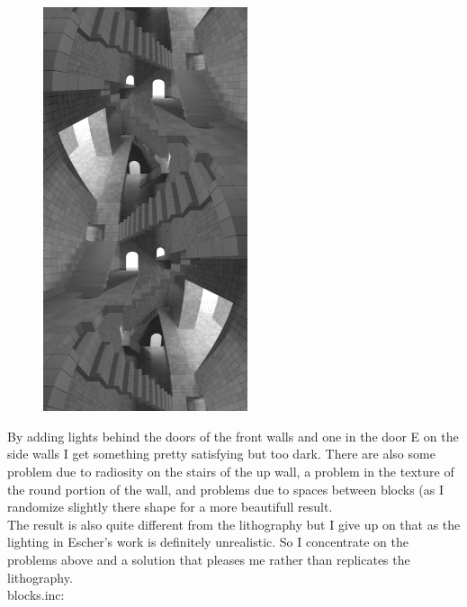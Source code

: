 \documentclass[12pt, a4paper]{article}
\begin{document}
\begin{center}
\begin{figure}[H]
\centering
\includegraphics[width=6cm]{./XL-51_14.png}\\
\end{figure}
\end{center}

By adding lights behind the doors of the front walls and one in the door E on the side walls I get something pretty satisfying but too dark. There are also some problem due to radiosity on the stairs of the up wall, a problem in the texture of the round portion of the wall, and problems due to spaces between blocks (as I randomize slightly there shape for a more beautifull result.\\

The result is also quite different from the lithography but I give up on that as the lighting in Escher's work is definitely unrealistic. So I concentrate on the problems above and a solution that pleases me rather than replicates the lithography.\\

blocks.inc:\\
\begin{scriptsize}
\begin{ttfamily}

\end{ttfamily}
\end{scriptsize}
\end{document}
